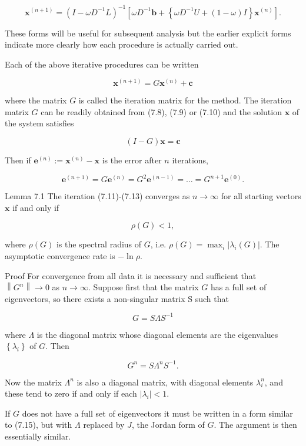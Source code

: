 \documentclass[10pt]{article}
\begin{document}
\[
\mathbf{x}^{(n+1)}=\left(I-\omega D^{-1} L\right)^{-1}\left[\omega D^{-1} \mathbf{b}+\left\{\omega D^{-1} U+(1-\omega) I\right\} \mathbf{x}^{(n)}\right] .
\]

These forms will be useful for subsequent analysis but the earlier explicit forms indicate more clearly how each procedure is actually carried out.

Each of the above iterative procedures can be written

\[
\mathbf{x}^{(n+1)}=G \mathbf{x}^{(n)}+\mathbf{c}
\]

where the matrix \(G\) is called the iteration matrix for the method. The iteration matrix \(G\) can be readily obtained from (7.8), (7.9) or (7.10) and the solution \(\mathbf{x}\) of the system satisfies

\[
(I-G) \mathbf{x}=\mathbf{c}
\]

Then if \(\mathbf{e}^{(n)}:=\mathbf{x}^{(n)}-\mathbf{x}\) is the error after \(n\) iterations,

\[
\mathbf{e}^{(n+1)}=G \mathbf{e}^{(n)}=G^{2} \mathbf{e}^{(n-1)}=\ldots=G^{n+1} \mathbf{e}^{(0)} .
\]

Lemma 7.1 The iteration (7.11)-(7.13) converges as \(n \rightarrow \infty\) for all starting vectors \(\mathbf{x}\) if and only if

\[
\rho(G)<1,
\]

where \(\rho(G)\) is the spectral radius of \(G\), i.e. \(\rho(G)=\max _{i}\left|\lambda_{i}(G)\right|\). The asymptotic convergence rate is \(-\ln \rho\).

Proof For convergence from all data it is necessary and sufficient that \(\left\|G^{n}\right\| \rightarrow 0\) as \(n \rightarrow \infty\). Suppose first that the matrix \(G\) has a full set of eigenvectors, so there exists a non-singular matrix S such that

\[
G=S \Lambda S^{-1}
\]

where \(\Lambda\) is the diagonal matrix whose diagonal elements are the eigenvalues \(\left\{\lambda_{i}\right\}\) of \(G\). Then

\[
G^{n}=S \Lambda^{n} S^{-1} .
\]

Now the matrix \(\Lambda^{n}\) is also a diagonal matrix, with diagonal elements \(\lambda_{i}^{n}\), and these tend to zero if and only if each \(\left|\lambda_{i}\right|<1\).

If \(G\) does not have a full set of eigenvectors it must be written in a form similar to (7.15), but with \(\Lambda\) replaced by \(J\), the Jordan form of \(G\). The argument is then essentially similar.
\end{document}
